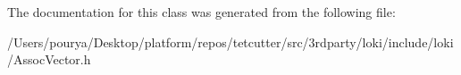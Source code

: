 The documentation for this class was generated from the following file\+:\begin{DoxyCompactItemize}
\item 
/\+Users/pourya/\+Desktop/platform/repos/tetcutter/src/3rdparty/loki/include/loki/Assoc\+Vector.\+h\end{DoxyCompactItemize}
